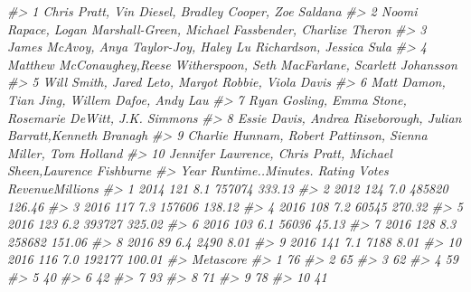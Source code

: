\documentclass[
]{book}
\newenvironment{Shaded}{\begin{snugshade}}{\end{snugshade}}
\newcommand{\CommentTok}[1]{\textcolor[rgb]{0.56,0.35,0.01}{\textit{#1}}}
\begin{document}
\begin{Shaded}
\begin{Highlighting}[]
\CommentTok{\#\textgreater{} 1                        Chris Pratt, Vin Diesel, Bradley Cooper, Zoe Saldana}
\CommentTok{\#\textgreater{} 2     Noomi Rapace, Logan Marshall{-}Green, Michael Fassbender, Charlize Theron}
\CommentTok{\#\textgreater{} 3            James McAvoy, Anya Taylor{-}Joy, Haley Lu Richardson, Jessica Sula}
\CommentTok{\#\textgreater{} 4  Matthew McConaughey,Reese Witherspoon, Seth MacFarlane, Scarlett Johansson}
\CommentTok{\#\textgreater{} 5                          Will Smith, Jared Leto, Margot Robbie, Viola Davis}
\CommentTok{\#\textgreater{} 6                               Matt Damon, Tian Jing, Willem Dafoe, Andy Lau}
\CommentTok{\#\textgreater{} 7                    Ryan Gosling, Emma Stone, Rosemarie DeWitt, J.K. Simmons}
\CommentTok{\#\textgreater{} 8             Essie Davis, Andrea Riseborough, Julian Barratt,Kenneth Branagh}
\CommentTok{\#\textgreater{} 9                Charlie Hunnam, Robert Pattinson, Sienna Miller, Tom Holland}
\CommentTok{\#\textgreater{} 10           Jennifer Lawrence, Chris Pratt, Michael Sheen,Laurence Fishburne}
\CommentTok{\#\textgreater{}    Year Runtime..Minutes. Rating  Votes RevenueMillions}
\CommentTok{\#\textgreater{} 1  2014               121    8.1 757074          333.13}
\CommentTok{\#\textgreater{} 2  2012               124    7.0 485820          126.46}
\CommentTok{\#\textgreater{} 3  2016               117    7.3 157606          138.12}
\CommentTok{\#\textgreater{} 4  2016               108    7.2  60545          270.32}
\CommentTok{\#\textgreater{} 5  2016               123    6.2 393727          325.02}
\CommentTok{\#\textgreater{} 6  2016               103    6.1  56036           45.13}
\CommentTok{\#\textgreater{} 7  2016               128    8.3 258682          151.06}
\CommentTok{\#\textgreater{} 8  2016                89    6.4   2490            8.01}
\CommentTok{\#\textgreater{} 9  2016               141    7.1   7188            8.01}
\CommentTok{\#\textgreater{} 10 2016               116    7.0 192177          100.01}
\CommentTok{\#\textgreater{}    Metascore}
\CommentTok{\#\textgreater{} 1         76}
\CommentTok{\#\textgreater{} 2         65}
\CommentTok{\#\textgreater{} 3         62}
\CommentTok{\#\textgreater{} 4         59}
\CommentTok{\#\textgreater{} 5         40}
\CommentTok{\#\textgreater{} 6         42}
\CommentTok{\#\textgreater{} 7         93}
\CommentTok{\#\textgreater{} 8         71}
\CommentTok{\#\textgreater{} 9         78}
\CommentTok{\#\textgreater{} 10        41}


\end{Highlighting}
\end{Shaded}
\end{document}

